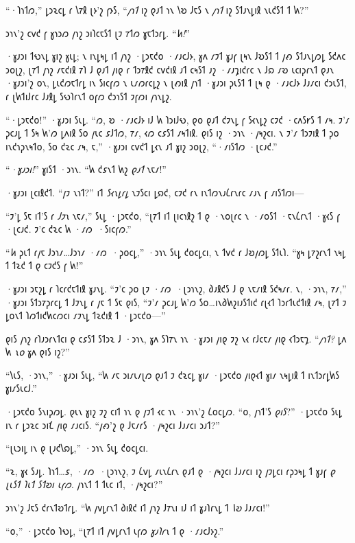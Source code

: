 “·𐑐𐑪𐑑𐑼,” 𐑛𐑮𐑷𐑤𐑛 𐑩 𐑘𐑳𐑙 𐑚𐑶'𐑟 𐑝𐑶𐑕, “\emph{𐑢𐑪𐑑} 𐑦𐑟 𐑞𐑨𐑑 𐑪𐑯 𐑘𐑹 𐑓𐑱𐑕 𐑯 \emph{𐑢𐑪𐑑} 𐑦𐑟 𐑕𐑑𐑨𐑯𐑛𐑦𐑙 𐑯𐑧𐑒𐑕𐑑 𐑑 𐑿?”

𐑮𐑪𐑯'𐑟 𐑤𐑫𐑒 𐑝 𐑣𐑪𐑮𐑼 𐑢𐑪𐑟 𐑮𐑦𐑐𐑤𐑱𐑕𐑑 𐑚𐑲 𐑳𐑑𐑼 𐑣𐑱𐑑𐑮𐑩𐑛. “\emph{𐑿!}”

·𐑣𐑨𐑮𐑦 𐑑𐑻𐑯𐑛 𐑣𐑦𐑟 𐑣𐑧𐑛; 𐑯 𐑦𐑯𐑛𐑰𐑛 𐑦𐑑 𐑢𐑪𐑟 ·𐑛𐑮𐑱𐑒𐑴 ·𐑥𐑨𐑤𐑓𐑶, 𐑣𐑵 𐑥𐑲𐑑 𐑣𐑨𐑝 𐑚𐑰𐑯 𐑓𐑹𐑕𐑑 𐑑 𐑢𐑺 𐑕𐑑𐑨𐑯𐑛𐑼𐑛 𐑕𐑒𐑵𐑤 𐑮𐑴𐑚𐑟, 𐑚𐑳𐑑 𐑢𐑪𐑟 𐑥𐑱𐑒𐑦𐑙 𐑳𐑐 𐑓 𐑞𐑨𐑑 𐑢𐑦𐑞 𐑩 𐑑𐑮𐑳𐑙𐑒 𐑤𐑫𐑒𐑦𐑙 𐑨𐑑 𐑤𐑰𐑕𐑑 𐑨𐑟 ·𐑥𐑨𐑡𐑦𐑒𐑩𐑤 𐑯 𐑓𐑸 𐑥𐑹 𐑧𐑤𐑦𐑜𐑩𐑯𐑑 𐑞𐑨𐑯 ·𐑣𐑨𐑮𐑦'𐑟 𐑴𐑯, 𐑛𐑧𐑒𐑼𐑱𐑑𐑩𐑛 𐑦𐑯 𐑕𐑦𐑤𐑝𐑼 𐑯 𐑧𐑥𐑼𐑩𐑤𐑛𐑟 𐑯 𐑚𐑺𐑦𐑙 𐑢𐑪𐑑 ·𐑣𐑨𐑮𐑦 𐑜𐑧𐑕𐑑 𐑑 𐑚𐑰 𐑞 ·𐑥𐑨𐑤𐑓𐑶 𐑓𐑨𐑥𐑤𐑦 𐑒𐑮𐑧𐑕𐑑, 𐑩 𐑚𐑿𐑑𐑦𐑓𐑩𐑤 𐑓𐑨𐑙𐑛 𐑕𐑻𐑐𐑩𐑯𐑑 𐑴𐑝𐑼 𐑒𐑮𐑪𐑕𐑑 𐑲𐑝𐑼𐑦 𐑢𐑪𐑯𐑛𐑟.

“·𐑛𐑮𐑱𐑒𐑴!” ·𐑣𐑨𐑮𐑦 𐑕𐑧𐑛. “𐑼, 𐑹 ·𐑥𐑨𐑤𐑓𐑶 𐑦𐑓 𐑿 𐑐𐑮𐑦𐑓𐑻, 𐑞𐑴 𐑞𐑨𐑑 𐑒𐑲𐑯𐑛 𐑝 𐑕𐑬𐑯𐑛𐑟 𐑤𐑲𐑒 ·𐑤𐑵𐑕𐑾𐑕 𐑑 𐑥𐑰. 𐑲'𐑥 𐑜𐑤𐑨𐑛 𐑑 𐑕𐑰 𐑿'𐑼 𐑛𐑵𐑦𐑙 𐑕𐑴 𐑢𐑧𐑤 𐑭𐑓𐑑𐑼, 𐑳𐑥, 𐑬𐑼 𐑤𐑭𐑕𐑑 𐑥𐑰𐑑𐑦𐑙. 𐑞𐑦𐑕 𐑦𐑟 ·𐑮𐑪𐑯 ·𐑢𐑰𐑟𐑤𐑦. 𐑯 𐑲'𐑥 𐑑𐑮𐑲𐑦𐑙 𐑑 𐑜𐑴 𐑦𐑯𐑒𐑪𐑜𐑯𐑰𐑑𐑴, 𐑕𐑴 𐑒𐑷𐑤 𐑥𐑰, 𐑱,” ·𐑣𐑨𐑮𐑦 𐑤𐑫𐑒𐑑 𐑛𐑬𐑯 𐑨𐑑 𐑣𐑦𐑟 𐑮𐑴𐑚𐑟, “·𐑥𐑦𐑕𐑑𐑼 ·𐑚𐑤𐑨𐑒.”

“\emph{·𐑣𐑨𐑮𐑦!}” 𐑣𐑦𐑕𐑑 ·𐑮𐑪𐑯. “𐑿 𐑒𐑭𐑯𐑑 𐑿𐑟 \emph{𐑞𐑨𐑑} 𐑯𐑱𐑥!”

·𐑣𐑨𐑮𐑦 𐑚𐑤𐑦𐑙𐑒𐑑. “𐑢𐑲 𐑯𐑪𐑑?” 𐑦𐑑 \emph{𐑕𐑬𐑯𐑛𐑩𐑛} 𐑯𐑲𐑕𐑤𐑦 𐑛𐑸𐑒, 𐑤𐑲𐑒 𐑩𐑯 𐑦𐑯𐑑𐑼𐑯𐑨𐑖𐑩𐑯𐑩𐑤 𐑥𐑨𐑯 𐑝 𐑥𐑦𐑕𐑑𐑼𐑦—

“𐑲'𐑛 𐑕𐑱 𐑦𐑑'𐑕 𐑩 \emph{𐑓𐑲𐑯} 𐑯𐑱𐑥,” 𐑕𐑧𐑛 ·𐑛𐑮𐑱𐑒𐑴, “𐑚𐑳𐑑 𐑦𐑑 𐑚𐑦𐑤𐑪𐑙𐑟 𐑑 𐑞 ·𐑯𐑴𐑚𐑩𐑤 𐑯 ·𐑥𐑴𐑕𐑑 ·𐑱𐑯𐑖𐑩𐑯𐑑 ·𐑣𐑬𐑕 𐑝 ·𐑚𐑤𐑨𐑒. 𐑲'𐑤 𐑒𐑷𐑤 𐑿 ·𐑥𐑼~·𐑕𐑦𐑤𐑝𐑼.”

“\emph{𐑿} 𐑜𐑧𐑑 𐑩𐑢𐑱 𐑓𐑮𐑪𐑥…𐑓𐑮𐑪𐑥 ·𐑥𐑼~·𐑜𐑴𐑤𐑛,” ·𐑮𐑪𐑯 𐑕𐑧𐑛 𐑒𐑴𐑤𐑛𐑤𐑦, 𐑯 𐑑𐑫𐑒 𐑩 𐑓𐑹𐑢𐑼𐑛 𐑕𐑑𐑧𐑐. “𐑣𐑰 𐑛𐑳𐑟𐑩𐑯𐑑 𐑯𐑰𐑛 𐑑 𐑑𐑷𐑒 𐑑 𐑞 𐑤𐑲𐑒𐑕 𐑝 𐑿!”

·𐑣𐑨𐑮𐑦 𐑮𐑱𐑟𐑛 𐑩 𐑐𐑤𐑩𐑒𐑱𐑑𐑦𐑙 𐑣𐑨𐑯𐑛. “𐑲'𐑤 𐑜𐑴 𐑚𐑲 ·𐑥𐑼~·𐑚𐑮𐑪𐑯𐑟, 𐑔𐑨𐑙𐑒𐑕 𐑓 𐑞 𐑯𐑱𐑥𐑦𐑙 𐑕𐑒𐑰𐑥𐑩. 𐑯, ·𐑮𐑪𐑯, 𐑳𐑥,” ·𐑣𐑨𐑮𐑦 𐑕𐑑𐑮𐑳𐑜𐑩𐑤𐑛 𐑑 𐑓𐑲𐑯𐑛 𐑩 𐑢𐑱 𐑑 𐑕𐑱 𐑞𐑦𐑕, “𐑲'𐑥 𐑜𐑤𐑨𐑛 𐑿'𐑼 𐑕𐑴…𐑦𐑯𐑔𐑿𐑟𐑦𐑨𐑕𐑑𐑦𐑒 𐑩𐑚𐑬𐑑 𐑐𐑮𐑩𐑑𐑧𐑒𐑑𐑦𐑙 𐑥𐑰, 𐑚𐑳𐑑 𐑲 𐑛𐑴𐑯𐑑 𐑐𐑼𐑑𐑦𐑒𐑿𐑤𐑼𐑤𐑦 𐑥𐑲𐑯𐑛 𐑑𐑷𐑒𐑦𐑙 𐑑 ·𐑛𐑮𐑱𐑒𐑴—”

𐑞𐑦𐑕 𐑢𐑪𐑟 𐑩𐑐𐑨𐑮𐑩𐑯𐑑𐑤𐑦 𐑞 𐑤𐑭𐑕𐑑 𐑕𐑑𐑮𐑷 𐑓 ·𐑮𐑪𐑯, 𐑣𐑵 𐑕𐑐𐑳𐑯 𐑪𐑯 ·𐑣𐑨𐑮𐑦 𐑢𐑦𐑞 𐑲𐑟 𐑯𐑬 𐑩𐑓𐑤𐑱𐑥 𐑢𐑦𐑞 𐑬𐑑𐑮𐑱𐑡. “\emph{𐑢𐑪𐑑?} 𐑛𐑵 𐑿 \emph{𐑯𐑴} 𐑣𐑵 𐑞𐑦𐑕 𐑦𐑟?”

“𐑘𐑧𐑕, ·𐑮𐑪𐑯,” ·𐑣𐑨𐑮𐑦 𐑕𐑧𐑛, “𐑿 𐑥𐑱 𐑮𐑦𐑥𐑧𐑥𐑚𐑼 𐑞𐑨𐑑 𐑲 𐑒𐑷𐑤𐑛 𐑣𐑦𐑥 ·𐑛𐑮𐑱𐑒𐑴 𐑢𐑦𐑞𐑬𐑑 𐑣𐑦𐑥 𐑯𐑰𐑛𐑦𐑙 𐑑 𐑦𐑯𐑑𐑮𐑩𐑛𐑿𐑕 𐑣𐑦𐑥𐑕𐑧𐑤𐑓.”

·𐑛𐑮𐑱𐑒𐑴 𐑕𐑯𐑦𐑜𐑼𐑛. 𐑞𐑧𐑯 𐑣𐑦𐑟 𐑲𐑟 𐑤𐑦𐑑 𐑪𐑯 𐑞 𐑢𐑲𐑑 𐑬𐑤 𐑪𐑯 ·𐑮𐑪𐑯'𐑟 𐑖𐑴𐑤𐑛𐑼. “𐑴, 𐑢𐑪𐑑'𐑕 \emph{𐑞𐑦𐑕}?” ·𐑛𐑮𐑱𐑒𐑴 𐑕𐑧𐑛 𐑦𐑯 𐑩 𐑛𐑮𐑷𐑤 𐑮𐑦𐑗 𐑢𐑦𐑞 𐑥𐑨𐑤𐑦𐑕. “𐑢𐑺'𐑟 𐑞 𐑓𐑱𐑥𐑩𐑕 ·𐑢𐑰𐑟𐑤𐑦 𐑓𐑨𐑥𐑤𐑦 𐑮𐑨𐑑?”

“𐑚𐑧𐑮𐑦𐑛 𐑦𐑯 𐑞 𐑚𐑨𐑒𐑘𐑸𐑛,” ·𐑮𐑪𐑯 𐑕𐑧𐑛 𐑒𐑴𐑤𐑛𐑤𐑦.

“𐑷, 𐑣𐑬 𐑕𐑨𐑛. 𐑐𐑪𐑑…𐑭, ·𐑥𐑼~·𐑚𐑮𐑪𐑯𐑟, 𐑲 𐑖𐑫𐑛 𐑥𐑧𐑯𐑖𐑩𐑯 𐑞𐑨𐑑 𐑞 ·𐑢𐑰𐑟𐑤𐑦 𐑓𐑨𐑥𐑤𐑦 𐑦𐑟 𐑢𐑲𐑛𐑤𐑦 𐑩𐑜𐑮𐑰𐑛 𐑑 𐑣𐑨𐑝 \emph{𐑞 𐑚𐑧𐑕𐑑 𐑐𐑧𐑑 𐑕𐑑𐑹𐑦 𐑧𐑝𐑼}. 𐑢𐑪𐑯𐑑 𐑑 𐑑𐑧𐑤 𐑦𐑑, ·𐑢𐑰𐑟𐑤𐑦?”

𐑮𐑪𐑯'𐑟 𐑓𐑱𐑕 𐑒𐑩𐑯𐑑𐑹𐑑𐑩𐑛. “𐑿 𐑢𐑫𐑛𐑩𐑯𐑑 𐑔𐑦𐑙𐑒 𐑦𐑑 𐑢𐑪𐑟 𐑓𐑳𐑯𐑦 𐑦𐑓 𐑦𐑑 𐑣𐑨𐑐𐑩𐑯𐑛 𐑑 \emph{𐑘𐑹} 𐑓𐑨𐑥𐑤𐑦!”

“𐑴,” ·𐑛𐑮𐑱𐑒𐑴 𐑐𐑻𐑛, “𐑚𐑳𐑑 𐑦𐑑 𐑢𐑫𐑛𐑩𐑯𐑑 𐑧𐑝𐑼 \emph{𐑣𐑨𐑐𐑩𐑯} 𐑑 𐑞 ·𐑥𐑨𐑤𐑓𐑶𐑟.”

